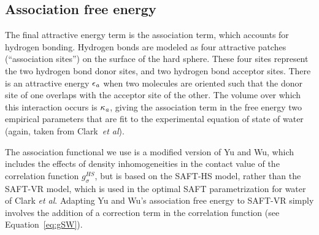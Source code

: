 \documentclass[twocolumn,amsmath,amssymb,prb]{revtex4-1}
\begin{document}
\subsection{Association free energy}
The final attractive energy term is the association term, which
accounts for hydrogen bonding.  Hydrogen bonds are modeled as four
attractive patches (``association sites'') on the surface of the hard
sphere.  These four sites represent the two hydrogen bond donor sites,
and two hydrogen bond acceptor sites.  There is an attractive energy
$\epsilon_\textit{a}$ when two molecules are oriented such that the donor site
of one overlaps with the acceptor site of the other.  The volume over
which this interaction occurs is $\kappa_\textit{a}$, giving the association
term in the free energy two empirical parameters that are fit to the
experimental equation of state of water (again, taken from
Clark~\emph{et al}\cite{clark2006developing}).

The association functional we use is a modified version of Yu
and Wu\cite{yu2002fmt-dft-inhomogeneous-associating}, which
includes the effects of density inhomogeneities in the contact value
of the correlation function $g^{HS}_\sigma$, but is based on the
SAFT-HS model, rather than the SAFT-VR
model\cite{gil-villegas-1997-SAFT-VR}, which is used in the optimal
SAFT parametrization for water of Clark \emph{et
  al}\cite{clark2006developing}.  Adapting Yu and Wu's association
free energy to SAFT-VR simply involves the addition of a correction
term in the correlation function (see Equation~\ref{eq:gSW}).
\end{document}
